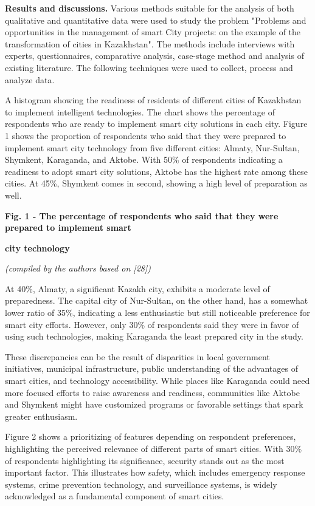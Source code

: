 {{\bfseries Results and discussions.} Various methods suitable for the
analysis of both qualitative and quantitative data were used to study
the problem "Problems and opportunities in the management of smart City
projects: on the example of the transformation of cities in Kazakhstan".
The methods include interviews with experts, questionnaires, comparative
analysis, case-stage method and analysis of existing literature. The
following techniques were used to collect, process and analyze data.

A histogram showing the readiness of residents of different cities of
Kazakhstan to implement intelligent technologies. The chart shows the
percentage of respondents who are ready to implement smart city
solutions in each city. Figure 1 shows the proportion of respondents who
said that they were prepared to implement smart city technology from
five different cities: Almaty, Nur-Sultan, Shymkent, Karaganda, and
Aktobe. With 50\% of respondents indicating a readiness to adopt smart
city solutions, Aktobe has the highest rate among these cities. At 45\%,
Shymkent comes in second, showing a high level of preparation as well.

{\bfseries Fig. 1 - The percentage of respondents who said that they were
prepared to implement smart}

{\bfseries city technology}

\emph{(compiled by the authors based on {[}28{]})}

At 40\%, Almaty, a significant Kazakh city, exhibits a moderate level of
preparedness. The capital city of Nur-Sultan, on the other hand, has a
somewhat lower ratio of 35\%, indicating a less enthusiastic but still
noticeable preference for smart city efforts. However, only 30\% of
respondents said they were in favor of using such technologies, making
Karaganda the least prepared city in the study.

These discrepancies can be the result of disparities in local government
initiatives, municipal infrastructure, public understanding of the
advantages of smart cities, and technology accessibility. While places
like Karaganda could need more focused efforts to raise awareness and
readiness, communities like Aktobe and Shymkent might have customized
programs or favorable settings that spark greater enthusiasm.

Figure 2 shows a prioritizing of features depending on respondent
preferences, highlighting the perceived relevance of different parts of
smart cities. With 30\% of respondents highlighting its significance,
security stands out as the most important factor. This illustrates how
safety, which includes emergency response systems, crime prevention
technology, and surveillance systems, is widely acknowledged as a
fundamental component of smart cities.

}

